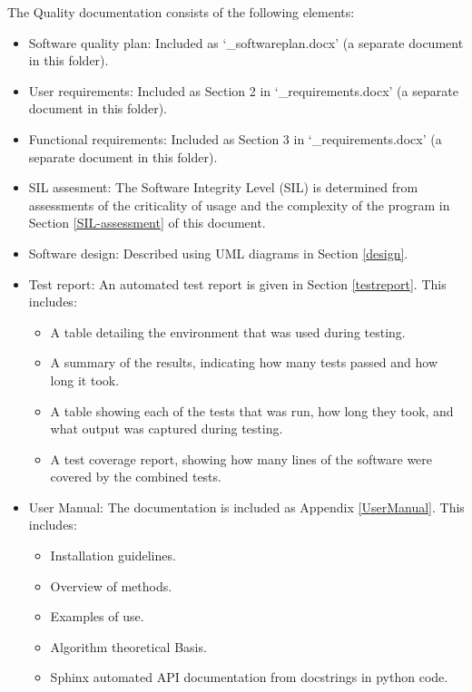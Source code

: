 \documentclass{article}
\begin{document}
The Quality documentation consists of the following elements:
\begin{itemize}
\item Software quality plan: Included as `\packagename\_softwareplan.docx' (a separate document in this folder).

\item User requirements: Included as Section 2 in `\packagename\_requirements.docx' (a separate document in this folder).

\item Functional requirements: Included as Section 3 in `\packagename\_requirements.docx' (a separate document in this folder).

\item SIL assesment: The Software Integrity Level (SIL) is determined from assessments of the criticality of usage and the complexity of the program in Section \ref{SIL-assessment} of this document.

\item Software design: Described using UML diagrams in Section \ref{design}.

\item Test report: An automated test report is given in Section \ref{testreport}. This includes:
\begin{itemize}
\item A table detailing the environment that was used during testing.
\item A summary of the results, indicating how many tests passed and how long it took.
\item A table showing each of the tests that was run, how long they took, and what output was captured during testing.
\item A test coverage report, showing how many lines of the software were covered by the combined tests.
\end{itemize}
\item User Manual: The \packagename documentation is included as Appendix \ref{UserManual}. This includes:
\begin{itemize}
\item Installation guidelines.
\item Overview of methods.
\item Examples of use.
\item Algorithm theoretical Basis.
\item Sphinx automated API documentation from docstrings in python code.
\end{itemize}
\end{itemize}
\end{document}
